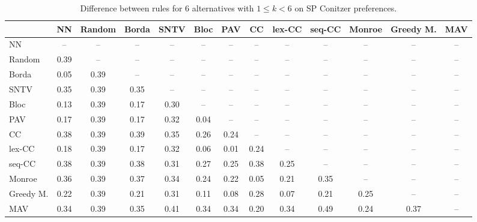 
\begin{table*}[h!]
\centering
\begin{tabular}{lcccccccccccc}
\toprule
 & NN & Random & Borda & SNTV & Bloc & PAV & CC & lex-CC & seq-CC & Monroe & Greedy M. & MAV \\
\midrule
NN & -- & -- & -- & -- & -- & -- & -- & -- & -- & -- & -- & -- \\
Random & 0.39 & -- & -- & -- & -- & -- & -- & -- & -- & -- & -- & -- \\
Borda & 0.05 & 0.39 & -- & -- & -- & -- & -- & -- & -- & -- & -- & -- \\
SNTV & 0.35 & 0.39 & 0.35 & -- & -- & -- & -- & -- & -- & -- & -- & -- \\
Bloc & 0.13 & 0.39 & 0.17 & 0.30 & -- & -- & -- & -- & -- & -- & -- & -- \\
PAV & 0.17 & 0.39 & 0.17 & 0.32 & 0.04 & -- & -- & -- & -- & -- & -- & -- \\
CC & 0.38 & 0.39 & 0.39 & 0.35 & 0.26 & 0.24 & -- & -- & -- & -- & -- & -- \\
lex-CC & 0.18 & 0.39 & 0.17 & 0.32 & 0.06 & 0.01 & 0.24 & -- & -- & -- & -- & -- \\
seq-CC & 0.38 & 0.39 & 0.38 & 0.31 & 0.27 & 0.25 & 0.38 & 0.25 & -- & -- & -- & -- \\
Monroe & 0.36 & 0.39 & 0.37 & 0.34 & 0.24 & 0.22 & 0.05 & 0.21 & 0.35 & -- & -- & -- \\
Greedy M. & 0.22 & 0.39 & 0.21 & 0.31 & 0.11 & 0.08 & 0.28 & 0.07 & 0.21 & 0.25 & -- & -- \\
MAV & 0.34 & 0.39 & 0.35 & 0.41 & 0.34 & 0.34 & 0.20 & 0.34 & 0.49 & 0.24 & 0.37 & -- \\
\bottomrule
\end{tabular}

\caption{Difference between rules for 6 alternatives with $1 \leq k < 6$ on SP Conitzer preferences.}
\end{table*}
